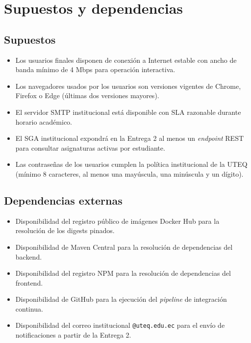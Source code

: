 \documentclass[11pt,a4paper,twoside]{report}
\begin{document}
\section{Supuestos y dependencias}
\label{sec:supuestos}

\subsection{Supuestos}

\begin{itemize}[leftmargin=1.5em,itemsep=2pt]
    \item Los usuarios finales disponen de conexi\'on a Internet estable con ancho de banda m\'inimo de 4 Mbps para operaci\'on interactiva.
    \item Los navegadores usados por los usuarios son versiones vigentes de Chrome, Firefox o Edge (\'ultimas dos versiones mayores).
    \item El servidor SMTP institucional est\'a disponible con SLA razonable durante horario acad\'emico.
    \item El SGA institucional expondr\'a en la Entrega 2 al menos un \emph{endpoint} REST para consultar asignaturas activas por estudiante.
    \item Las contrase\~nas de los usuarios cumplen la pol\'itica institucional de la UTEQ (m\'inimo 8 caracteres, al menos una may\'uscula, una min\'uscula y un d\'igito).
\end{itemize}

\subsection{Dependencias externas}

\begin{itemize}[leftmargin=1.5em,itemsep=2pt]
    \item Disponibilidad del registro p\'ublico de im\'agenes Docker Hub para la resoluci\'on de los digests pinados.
    \item Disponibilidad de Maven Central para la resoluci\'on de dependencias del backend.
    \item Disponibilidad del registro NPM para la resoluci\'on de dependencias del frontend.
    \item Disponibilidad de GitHub para la ejecuci\'on del \emph{pipeline} de integraci\'on continua.
    \item Disponibilidad del correo institucional \texttt{@uteq.edu.ec} para el env\'io de notificaciones a partir de la Entrega 2.
\end{itemize}
\end{document}
